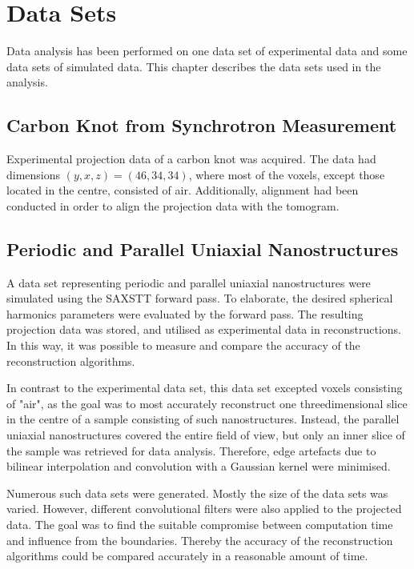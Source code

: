 \chapter{Data Sets} %
\label{ch:reconstruction_data_sets}

Data analysis has been performed on one data set of experimental data and some data sets of simulated data.
This chapter describes the data sets used in the analysis.

\section{Carbon Knot from Synchrotron Measurement} %
\label{sec:data_set_carbon_knot}
Experimental projection data of a carbon knot was acquired.
The data had dimensions $(y,x,z) = (46,34,34)$, where most of the voxels, except those located in the centre, consisted of air.  %
Additionally, alignment had been conducted in order to align the projection data with the tomogram.


\section{Periodic and Parallel Uniaxial Nanostructures} %
\label{sec:reconstruction_data_sets_periodic_parallel_uniaxial_nanostructures}
A data set representing periodic and parallel uniaxial nanostructures were simulated using the SAXSTT forward pass.
To elaborate, the desired spherical harmonics parameters were evaluated by the forward pass.
The resulting projection data was stored, and utilised as experimental data in reconstructions.
In this way, it was possible to measure and compare the accuracy of the reconstruction algorithms.

In contrast to the experimental data set, this data set excepted voxels consisting of "air",
as the goal was to most accurately reconstruct one threedimensional slice in the centre of a sample consisting of such nanostructures.
Instead, the parallel uniaxial nanostructures covered the entire field of view, but only an inner slice of the sample was retrieved for data analysis.
Therefore, edge artefacts due to bilinear interpolation and convolution with a Gaussian kernel were minimised.

Numerous such data sets were generated. Mostly the size of the data sets was varied. However, different convolutional filters were also applied to the projected data.
The goal was to find the suitable compromise between computation time and influence from the boundaries.
Thereby the accuracy of the reconstruction algorithms could be compared accurately in a reasonable amount of time.

